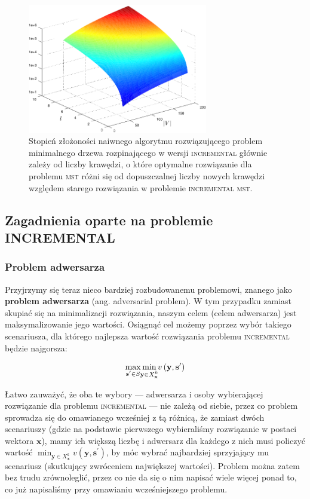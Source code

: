 \begin{figure}[!htbp]
	\null\hfill
	\includegraphics[width=0.7\textwidth]{Chapter_II/INC-MST-Other/incmst3DPlot_psfrag}
	\hfill\null
	\caption{
		Stopień złożoności naiwnego algorytmu rozwiązującego problem minimalnego drzewa rozpinającego w wersji \textsc{incremental} głównie zależy od liczby krawędzi, o które optymalne rozwiązanie dla problemu \textsc{mst} różni się od dopuszczalnej liczby nowych krawędzi względem starego rozwiązania w problemie \textsc{incremental mst}.
	}
	\label{fig:incmst3D}
\end{figure}

\subsection{Zagadnienia oparte na problemie INCREMENTAL}

\subsubsection{Problem adwersarza}\label{sec:adv}

Przyjrzymy się teraz nieco bardziej rozbudowanemu problemowi, znanego jako \textbf{problem adwersarza} (ang. adversarial problem). W tym przypadku zamiast skupiać się na minimalizacji rozwiązania, naszym celem (celem adwersarza) jest maksymalizowanie jego wartości. Osiągnąć cel możemy poprzez wybór takiego scenariusza, dla którego najlepsza wartość rozwiązania problemu \textsc{incremental} będzie najgorsza:

\begin{equation}
	\max_{\mathclap{\textbf{s}^{\prime} \in S}} \min_{\mathclap{\textbf{y} \in X^{k}_{\textbf{x}}}} v \left( \textbf{y}, \textbf{s}^{\prime} \right)
\end{equation}

Łatwo zauważyć, że oba te wybory --- adwersarza i osoby wybierającej rozwiązanie dla problemu \textsc{incremental} --- nie zależą od siebie, przez co problem sprowadza się do omawianego wcześniej z tą różnicą, że zamiast dwóch scenariuszy (gdzie na podstawie pierwszego wybieraliśmy rozwiązanie w postaci wektora $\textbf{x}$), mamy ich większą liczbę i adwersarz dla każdego z nich musi policzyć wartość $\min_{\textbf{y} \in X^{k}_{\textbf{x}}} v \left( \textbf{y}, \textbf{s}^{\prime} \right)$, by móc wybrać najbardziej sprzyjający mu scenariusz (skutkujący zwróceniem największej wartości). Problem można zatem bez trudu zrównoleglić, przez co nie da się o nim napisać wiele więcej ponad to, co już napisaliśmy przy omawianiu wcześniejszego problemu.

